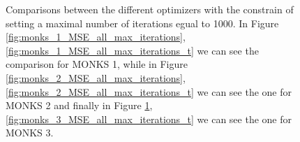 \begin{figure}[t!]
\begin{subfigure}{0.45\textwidth}
{                    }
                    \caption{}
                    \label{fig:monks_3_MSE_all_max_iterations}
                \end{subfigure}
                \caption{Comparisons between the different optimizers with the constrain of setting a
                maximal number of iterations egual to 1000. In Figure \ref{fig:monks_1_MSE_all_max_iterations}, \ref{fig:monks_1_MSE_all_max_iterations_t}
                we can see the comparison for MONKS 1, while in Figure \ref{fig:monks_2_MSE_all_max_iterations}, \ref{fig:monks_2_MSE_all_max_iterations_t}
                we can see the one for MONKS 2 and finally in Figure \ref{fig:monks_3_MSE_all_max_iterations}, \ref{fig:monks_3_MSE_all_max_iterations_t} we
                can see the one for MONKS 3.}
                \label{fig:monks_MSE_all_max_iterations}
            \end{figure}






